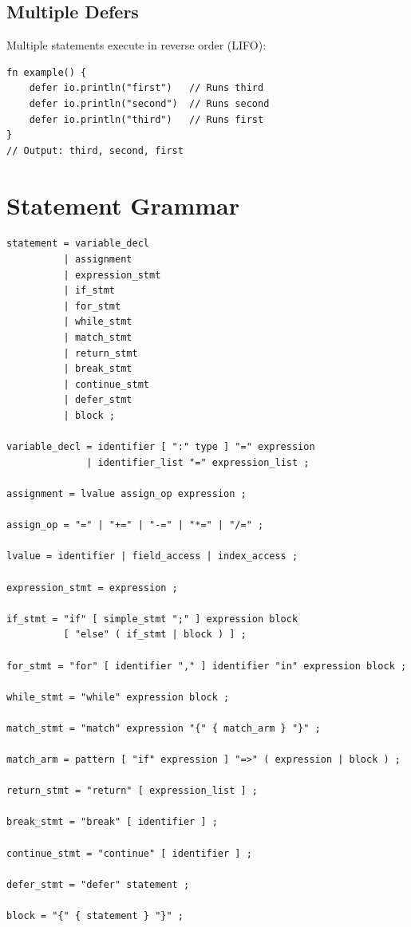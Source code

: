 \subsection{Multiple Defers}

Multiple  statements execute in reverse order (LIFO):

\begin{lstlisting}
fn example() {
    defer io.println("first")   // Runs third
    defer io.println("second")  // Runs second
    defer io.println("third")   // Runs first
}
// Output: third, second, first
\end{lstlisting}

\section{Statement Grammar}

\begin{lstlisting}[language=EBNF]
statement = variable_decl
          | assignment
          | expression_stmt
          | if_stmt
          | for_stmt
          | while_stmt
          | match_stmt
          | return_stmt
          | break_stmt
          | continue_stmt
          | defer_stmt
          | block ;

variable_decl = identifier [ ":" type ] "=" expression
              | identifier_list "=" expression_list ;

assignment = lvalue assign_op expression ;

assign_op = "=" | "+=" | "-=" | "*=" | "/=" ;

lvalue = identifier | field_access | index_access ;

expression_stmt = expression ;

if_stmt = "if" [ simple_stmt ";" ] expression block
          [ "else" ( if_stmt | block ) ] ;

for_stmt = "for" [ identifier "," ] identifier "in" expression block ;

while_stmt = "while" expression block ;

match_stmt = "match" expression "{" { match_arm } "}" ;

match_arm = pattern [ "if" expression ] "=>" ( expression | block ) ;

return_stmt = "return" [ expression_list ] ;

break_stmt = "break" [ identifier ] ;

continue_stmt = "continue" [ identifier ] ;

defer_stmt = "defer" statement ;

block = "{" { statement } "}" ;
\end{lstlisting}
